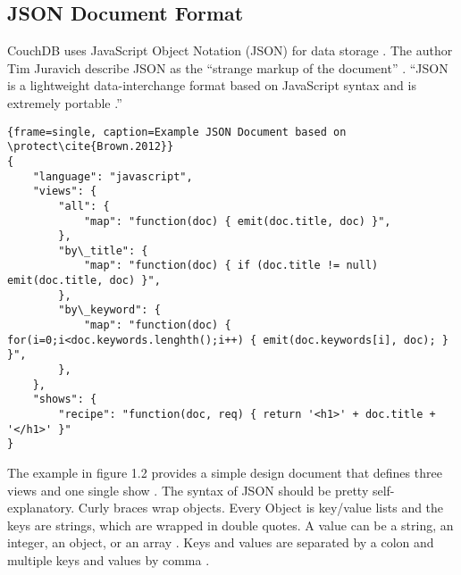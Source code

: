 \subsection{JSON Document Format}
CouchDB uses JavaScript Object Notation (JSON) for data storage \cite{Anderson.2010.Buch}.
The author Tim Juravich describe JSON as the ``strange markup of the document'' \cite{Juravich2012}. ``JSON is a lightweight data-interchange format based on JavaScript syntax and is extremely portable \cite{Juravich2012}.''
\newpage
\begin{lstlisting}{frame=single, caption=Example JSON Document based on \protect\cite{Brown.2012}}
{
    "language": "javascript",
    "views": {
        "all": {
            "map": "function(doc) { emit(doc.title, doc) }",
        },
        "by\_title": {
            "map": "function(doc) { if (doc.title != null) emit(doc.title, doc) }",
        },
        "by\_keyword": {
            "map": "function(doc) { for(i=0;i<doc.keywords.lenghth();i++) { emit(doc.keywords[i], doc); } }",
        },
    },
    "shows": {
        "recipe": "function(doc, req) { return '<h1>' + doc.title + '</h1>' }"
}
\end{lstlisting}
The example in figure 1.2 provides a simple design document that defines three views and one single show \cite{Brown.2012}. The syntax of JSON should be pretty self-explanatory. Curly braces wrap objects. Every Object is key/value lists and the keys are strings, which are wrapped in double quotes. A value can be a string, an integer, an object, or an array \cite{CouchDB.Guide}. Keys and values are separated by a colon and multiple keys and values by comma \cite{CouchDB.Guide}. \\
